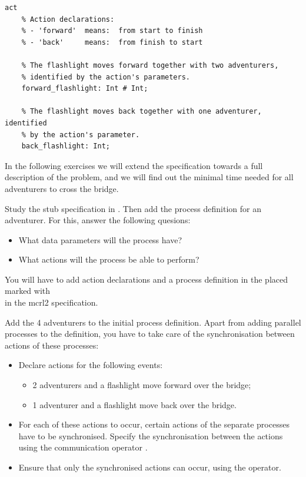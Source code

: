 \documentclass[11pt]{article}
\theoremstyle{myplain}
\theoremstyle{definition} %
\begin{document}
\begin{lstlisting}[style=mcrl2]
act
    % Action declarations:
    % - 'forward'  means:  from start to finish
    % - 'back'     means:  from finish to start

    % The flashlight moves forward together with two adventurers,
    % identified by the action's parameters.
    forward_flashlight: Int # Int;

    % The flashlight moves back together with one adventurer, identified
    % by the action's parameter.
    back_flashlight: Int;
\end{lstlisting}

In the following exercises we will extend the specification towards a full description of the problem, and we will find out the minimal time needed for all adventurers to cross the bridge.


\bigskip 
\begin{exercise}
Study the stub specification in . Then add the process definition for an adventurer. For this, answer the following quesions:
\begin{itemize}
  \item What data parameters will the process have?
  \item What actions will the process be able to perform?
\end{itemize} 
You will have to add action declarations and a process definition in the placed marked with\\ in the mcrl2 specification.
\end{exercise}


\bigskip
\begin{exercise}
Add the 4 adventurers to the initial process definition. Apart from adding parallel processes to the definition, you have to take care of the synchronisation between actions of these processes:
\begin{itemize}
  \item Declare actions for the following events:
  \begin{itemize}
    \item 2 adventurers and a flashlight move forward over the bridge;
    \item 1 adventurer and a flashlight move back over the bridge.
  \end{itemize}
  \item For each of these actions to occur, certain actions of the separate processes have to be synchronised. Specify the synchronisation between the actions using the communication operator .
  \item Ensure that only the synchronised actions can occur, using the  operator.
\end{itemize}
\end{exercise}
 
\end{document}
